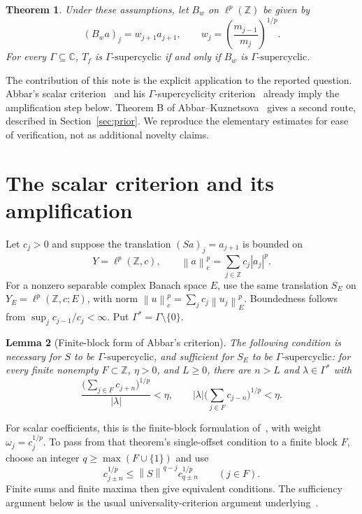 \documentclass[11pt]{article}
\newtheorem{theorem}{Theorem}
\newtheorem{lemma}[theorem]{Lemma}
\theoremstyle{remark}
\newcommand{\C}{\mathbb C}
\newcommand{\Z}{\mathbb Z}
\newcommand{\norm}[1]{\left\|#1\right\|}
\newcommand{\abs}[1]{\left|#1\right|}
\newcommand{\gs}{\Gamma\text{-supercyclic}}
\begin{document}
\begin{theorem}\label{thm:main}
Under these assumptions, let $B_w$ on $\ell^p(\Z)$ be given by
\[
(B_wa)_j=w_{j+1}a_{j+1},\qquad
w_j=\left(\frac{m_{j-1}}{m_j}\right)^{1/p}.
\]
For every $\Gamma\subseteq\C$, $T_f$ is $\gs$ if and only if $B_w$ is $\gs$.
\end{theorem}

The contribution of this note is the explicit application to the reported question. Abbar's scalar criterion~\cite[Theorem A]{Abbar} and his $\Gamma$-supercyclicity criterion~\cite[Theorem 2]{Abbar} already imply the amplification step below. Theorem B of Abbar--Kuznetsova~\cite{AK} gives a second route, described in Section~\ref{sec:prior}. We reproduce the elementary estimates for ease of verification, not as additional novelty claims.

\section{The scalar criterion and its amplification}

Let $c_j>0$ and suppose the translation $(Sa)_j=a_{j+1}$ is bounded on
\[
Y=\ell^p(\Z,c),\qquad \norm{a}_c^p=\sum_{j\in\Z}c_j\abs{a_j}^p.
\]
For a nonzero separable complex Banach space $E$, use the same translation $S_E$ on $Y_E=\ell^p(\Z,c;E)$, with norm $\norm{u}_c^p=\sum_j c_j\norm{u_j}_E^p$. Boundedness follows from $\sup_j c_{j-1}/c_j<\infty$. Put $\Gamma^*=\Gamma\setminus\{0\}$.

\begin{lemma}[Finite-block form of Abbar's criterion]\label{lem:tails}
The following condition is necessary for $S$ to be $\gs$, and sufficient for $S_E$ to be $\gs$: for every finite nonempty $F\subset\Z$, $\eta>0$, and $L\ge0$, there are $n>L$ and $\lambda\in\Gamma^*$ with
\begin{equation}\label{eq:tails}
\frac{\bigl(\sum_{j\in F}c_{j+n}\bigr)^{1/p}}{\abs{\lambda}}<\eta,
\qquad
\abs{\lambda}\bigl(\sum_{j\in F}c_{j-n}\bigr)^{1/p}<\eta.
\end{equation}
\end{lemma}

For scalar coefficients, this is the finite-block formulation of~\cite[Theorem A]{Abbar}, with weight $\omega_j=c_j^{1/p}$. To pass from that theorem's single-offset condition to a finite block $F$, choose an integer $q\ge\max(F\cup\{1\})$ and use
\[
c_{j\pm n}^{1/p}\le\norm{S}^{q-j}c_{q\pm n}^{1/p}\qquad(j\in F).
\]
Finite sums and finite maxima then give equivalent conditions. The sufficiency argument below is the usual universality-criterion argument underlying~\cite[Theorem 2]{Abbar}.
\end{document}
